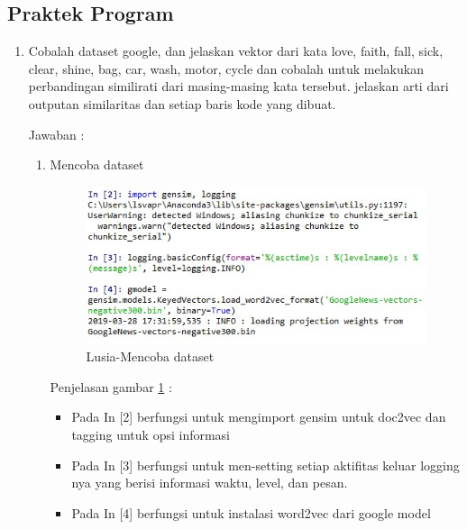 \subsection{Praktek Program}
\begin{enumerate}
\item Cobalah dataset google, dan jelaskan vektor dari kata love, faith, fall, sick, clear, shine, bag, car, wash, motor, cycle dan cobalah untuk melakukan perbandingan similirati dari masing-masing kata tersebut. jelaskan arti dari outputan similaritas dan setiap baris kode yang dibuat.
	\par Jawaban :
	\begin{enumerate}
		\item Mencoba dataset
		
			\begin{figure}[ht]
			\centering
			\includegraphics[scale=0.4]{figures/chap5.jpg}
			\caption{Lusia-Mencoba dataset}
			\label{5b1}
			\end{figure}
			
			\par Penjelasan gambar \ref{5b1} :
			\begin{itemize}
				\item Pada In [2] berfungsi untuk mengimport gensim untuk doc2vec dan tagging untuk opsi informasi
				\item Pada In [3] berfungsi  untuk men-setting setiap aktifitas keluar logging nya yang berisi informasi waktu, level, dan pesan.
				\item Pada In [4] berfungsi  untuk instalasi word2vec dari google model 
			\end{itemize}
			

\end{enumerate}
\end{enumerate}
